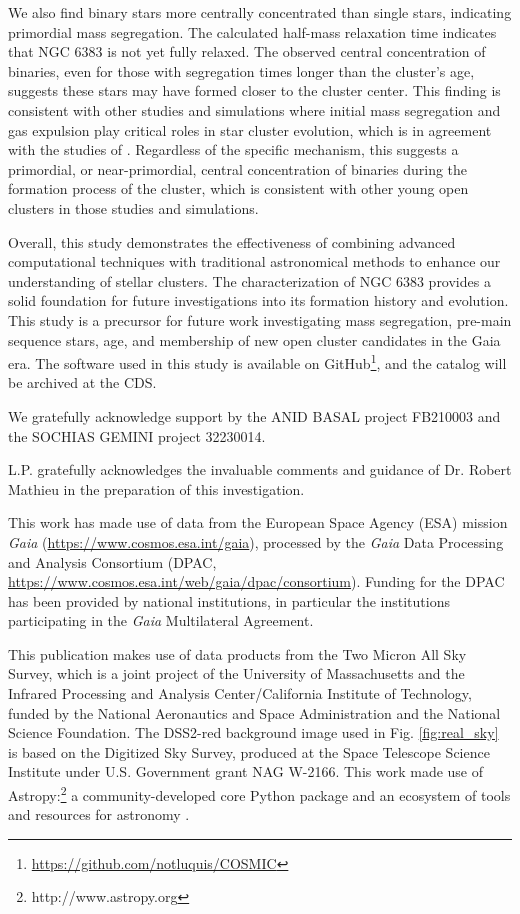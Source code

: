 \documentclass{aa}
\begin{document}
We also find binary stars more centrally concentrated than single stars, indicating primordial mass segregation. The calculated half-mass relaxation time indicates that NGC 6383 is not yet fully relaxed. The observed central concentration of binaries, even for those with segregation times longer than the cluster’s age, suggests these stars may have formed closer to the cluster center. This finding is consistent with other studies and simulations where initial mass segregation and gas expulsion play critical roles in star cluster evolution, which is in agreement with the studies of \citet{2007ApJ...655L..45M,2008MNRAS.386.2047M,2007AJ....134.1368C,2007MNRAS.381L..40D,2008AJ....135..173S}. Regardless of the specific mechanism, this suggests a primordial, or near-primordial, central concentration of binaries during the formation process of the cluster, which is consistent with other young open clusters in those studies and simulations.

Overall, this study demonstrates the effectiveness of combining advanced computational techniques with traditional astronomical methods to enhance our understanding of stellar clusters. The characterization of NGC 6383 provides a solid foundation for future investigations into its formation history and evolution. This study is a precursor for future work investigating mass segregation, pre-main sequence stars, age, and membership of new open cluster candidates in the Gaia era. The software used in this study is available on GitHub\footnote{\url{https://github.com/notluquis/COSMIC}}, and the catalog will be archived at the CDS.

\begin{acknowledgements}
We gratefully acknowledge support by the ANID BASAL project FB210003 and the SOCHIAS GEMINI project 32230014.

L.P. gratefully acknowledges the invaluable comments and guidance of Dr. Robert Mathieu in the preparation of this investigation.

This work has made use of data from the European Space Agency (ESA) mission {\it Gaia} (\url{https://www.cosmos.esa.int/gaia}), processed by the {\it Gaia} Data Processing and Analysis Consortium (DPAC, \url{https://www.cosmos.esa.int/web/gaia/dpac/consortium}). Funding for the DPAC has been provided by national institutions, in particular the institutions participating in the {\it Gaia} Multilateral Agreement. 

This publication makes use of data products from the Two Micron All Sky Survey, which is a joint project of the University of Massachusetts and the Infrared Processing and Analysis Center/California Institute of Technology, funded by the National Aeronautics and Space Administration and the National Science Foundation. The DSS2-red background image used in Fig. \ref{fig:real_sky} is based on the Digitized Sky Survey, produced at the Space Telescope Science Institute under U.S. Government grant NAG W-2166. This work made use of Astropy:\footnote{http://www.astropy.org} a community-developed core Python package and an ecosystem of tools and resources for astronomy \citep{astropy:2013, astropy:2018, astropy:2022}.
\end{acknowledgements}
\end{document}
